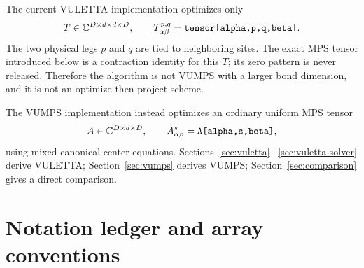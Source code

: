 \documentclass[11pt]{article}
\newcommand{\CC}{\mathbb{C}}
\newcommand{\code}[1]{\texttt{\detokenize{#1}}}
\begin{document}
The current VULETTA implementation optimizes only
\begin{equation}
  T\in\CC^{D\times d\times d\times D},
  \qquad T^{p,q}_{\alpha\beta}
  =\code{tensor[alpha,p,q,beta]}.
  \label{eq:letta-shape}
\end{equation}
The two physical legs $p$ and $q$ are tied to neighboring sites.  The exact
MPS tensor introduced below is a contraction identity for this $T$; its zero
pattern is never released.  Therefore the algorithm is not VUMPS with a
larger bond dimension, and it is not an optimize-then-project scheme.

The VUMPS implementation instead optimizes an ordinary uniform MPS tensor
\begin{equation}
  A\in\CC^{D\times d\times D},
  \qquad A^s_{\alpha\beta}=\code{A[alpha,s,beta]},
  \label{eq:mps-shape}
\end{equation}
using mixed-canonical center equations.  Sections~\ref{sec:vuletta}--
\ref{sec:vuletta-solver} derive VULETTA; Section~\ref{sec:vumps} derives VUMPS;
Section~\ref{sec:comparison} gives a direct comparison.

\section{Notation ledger and array conventions}
\label{sec:notation}
\end{document}
